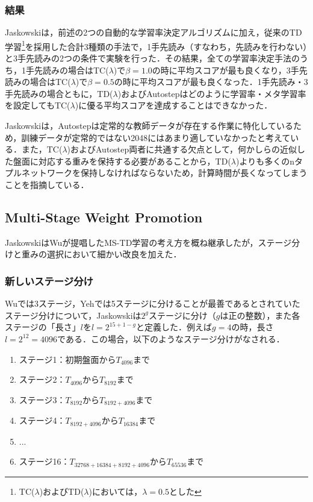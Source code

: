 \documentclass{suribt}
\begin{document}
\subsubsection{結果}
Jaskowskiは，前述の2つの自動的な学習率決定アルゴリズムに加え，従来のTD学習\footnote{TC(${\lambda}$)およびTD(${\lambda}$)においては，${\lambda}=0.5$とした}を採用した合計3種類の手法で，1手先読み（すなわち，先読みを行わない）と3手先読みの2つの条件で実験を行った．その結果，全ての学習率決定手法のうち，1手先読みの場合はTC(${\lambda}$)で${\beta}=1.0$の時に平均スコアが最も良くなり，3手先読みの場合はTC(${\lambda}$)で${\beta}=0.5$の時に平均スコアが最も良くなった．1手先読み・3手先読みの場合ともに，TD(${\lambda}$)およびAutostepはどのように学習率・メタ学習率を設定してもTC(${\lambda}$)に優る平均スコアを達成することはできなかった．

Jaskowskiは，Autostepは定常的な教師データが存在する作業に特化しているため，訓練データが定常的ではない2048にはあまり適していなかったと考えている．また，TC(${\lambda}$)およびAutostep両者に共通する欠点として，何かしらの近似した盤面に対応する重みを保持する必要があることから，TD(${\lambda}$)よりも多くのnタプルネットワークを保持しなければならないため，計算時間が長くなってしまうことを指摘している．

\subsection{Multi-Stage Weight Promotion}
JaskowskiはWuが提唱したMS-TD学習の考え方を概ね継承したが，ステージ分けと重みの選択において細かい改良を加えた．

\subsubsection{新しいステージ分け}
Wuでは3ステージ，Yehでは5ステージに分けることが最善であるとされていたステージ分けについて，Jaskowskiは$2^g$ステージに分け（$g$は正の整数），また各ステージの「長さ」$l$を$l = 2^{15+1-g}$と定義した．例えば$g=4$の時，長さ$l=2^{12}=4096$である．この場合，以下のようなステージ分けがなされる．

\begin{enumerate}
\item ステージ1：初期盤面から$T_{4096}$まで
\item ステージ2：$T_{4096}$から$T_{8192}$まで
\item ステージ3：$T_{8192}$から$T_{8192+4096}$まで
\item ステージ4：$T_{8192+4096}$から$T_{16384}$まで
\item ...
\item ステージ16：$T_{32768+16384+8192+4096}$から$T_{65536}$まで
\end{enumerate}
\end{document}
